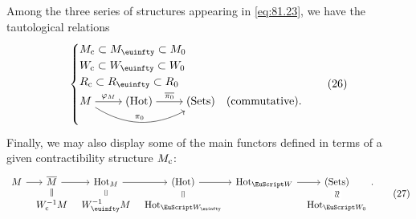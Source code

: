 Among the three series of structures appearing in \eqref{eq:81.23}, we
have the tautological relations
\begin{equation}
  \label{eq:81.26}
  \begin{cases}
    M\subc \subset M_\oo \subset M_0 & \\
    W\subc \subset W_\oo \subset W_0 & \\
    R\subc \subset R_\oo \subset R_0 & \\
    \begin{tikzcd}[cramped]
      M \ar[r,"\varphi_M"] \ar[rr,bend right, "\pi_0"] &
      \Hot \ar[r,"\overline{\piz}"] & \Sets
    \end{tikzcd} & \text{(commutative).}
  \end{cases}\tag{26}
\end{equation}
Finally, we may also display some of the main functors defined in
terms of a given contractibility structure $M_{\mathrm{c}}$:
\begin{equation}
  \label{eq:81.27}
  \begin{tabular}{@{}c@{}}
  \begin{tikzcd}[baseline=(O.base),sep=tiny]
    |[alias=O]| M\ar[r] &
    \overline M \ar[r]\ar[d,equal] &
    \HotOf_M \ar[r]\ar[d,equal] &
    \Hot \ar[r]\ar[d,equal] &
    \HotOf_\scrW \ar[r] &
    \Sets\ar[d,phantom,sloped,"\equ" description] \\
    & W\subc^{-1}M & W_\oo^{-1}M & \HotOf_\scrWoo & & \HotOf_\scrWz
  \end{tikzcd}.
  \end{tabular}\tag{27}
\end{equation}

\bigbreak

\noindent\hfill{}\par

